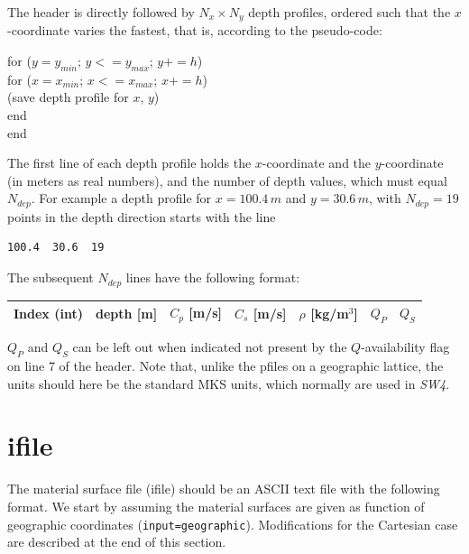 \documentclass[11pt]{report}
\begin{document}
{The header is directly followed by $N_{x}\times N_{y}$ depth profiles, ordered such that the $x$-coordinate
varies the fastest, that is, according to the pseudo-code:
\begin{flushleft}
	\hspace{10mm}  for ($y= y_{min}$; $y <= y_{max}$; $y += h$)\\
	\hspace{20mm}    for ($x= x_{min}$; $x <= x_{max}$; $x += h$)\\
	\hspace{30mm}      (save depth profile for $x$, $y$)\\
	\hspace{20mm}    end\\
	\hspace{10mm}  end
\end{flushleft}
The first line of each depth profile holds the $x$-coordinate and the $y$-coordinate (in meters as real
numbers), and the number of depth values, which must equal $N_{dep}$. For example a depth profile
for $x=100.4\,m$ and $y=30.6\,m$, with $N_{dep}=19$ points in the depth direction starts with the line
\begin{verbatim}
100.4  30.6  19
\end{verbatim}
The subsequent $N_{dep}$ lines have the following format:
\begin{center}
	\begin{tabular}{lllllll}\hline
		Index (int) & depth [m] & $C_p$ [m/s] & $C_s$ [m/s] & $\rho$ [kg/m$^3$] & $Q_P$ & $Q_S$ \\ \hline
	\end{tabular}
\end{center}
$Q_P$ and $Q_S$ can be left out when indicated not present by the $Q$-availability flag on line 7 of
the header.  Note that, unlike the pfiles on a geographic lattice, the units should here be
the standard MKS units, which normally are used in \emph{SW4}.


\section{ifile}\label{sec:ifile-format}

The material surface file (ifile) should be an ASCII text file with the following format. We start
by assuming the material surfaces are given as function of geographic coordinates
(\verb+input=geographic+). Modifications for the Cartesian case are described at the end of this
section.

}
\end{document}
